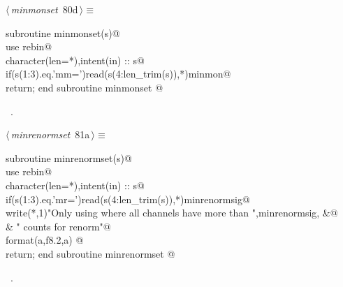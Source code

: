 \documentclass[10pt,a4paper,notitlepage]{article}
\begin{document}
\begin{flushleft} \small
\begin{minipage}{\linewidth}\label{scrap93}\raggedright\small
{} $\langle\,${\it minmonset}\nobreak\ {\footnotesize {80d}}$\,\rangle\equiv$
\vspace{-1ex}
\begin{list}{}{} \item
\mbox{}\verb@      subroutine minmonset(s)@\\
\mbox{}\verb@      use rebin@\\
\mbox{}\verb@      character(len=*),intent(in) :: s@\\
\mbox{}\verb@      if(s(1:3).eq.'mm=')read(s(4:len_trim(s)),*)minmon@\\
\mbox{}\verb@      return; end subroutine minmonset                                     @{\NWsep}
\end{list}
\vspace{-1.5ex}
\footnotesize
\begin{list}{}{\setlength{\itemsep}{-\parsep}\setlength{\itemindent}{-\leftmargin}}
\item \NWtxtMacroRefIn\ .

\item{}
\end{list}
\end{minipage}\vspace{4ex}
\end{flushleft}
\begin{flushleft} \small
\begin{minipage}{\linewidth}\label{scrap94}\raggedright\small
{} $\langle\,${\it minrenormset}\nobreak\ {\footnotesize {81a}}$\,\rangle\equiv$
\vspace{-1ex}
\begin{list}{}{} \item
\mbox{}\verb@      subroutine minrenormset(s)@\\
\mbox{}\verb@      use rebin@\\
\mbox{}\verb@      character(len=*),intent(in) :: s@\\
\mbox{}\verb@      if(s(1:3).eq.'mr=')read(s(4:len_trim(s)),*)minrenormsig@\\
\mbox{}\verb@      write(*,1)"Only using where all channels have more than ",minrenormsig, &@\\
\mbox{}\verb@     & " counts for renorm"@\\
\mbox{}     format(a,f8.2,a) @\\
\mbox{}\verb@      return; end subroutine minrenormset                                  @{\NWsep}
\end{list}
\vspace{-1.5ex}
\footnotesize
\begin{list}{}{\setlength{\itemsep}{-\parsep}\setlength{\itemindent}{-\leftmargin}}
\item \NWtxtMacroRefIn\ .

\item{}
\end{list}
\end{minipage}\vspace{4ex}
\end{flushleft}
\end{document}
